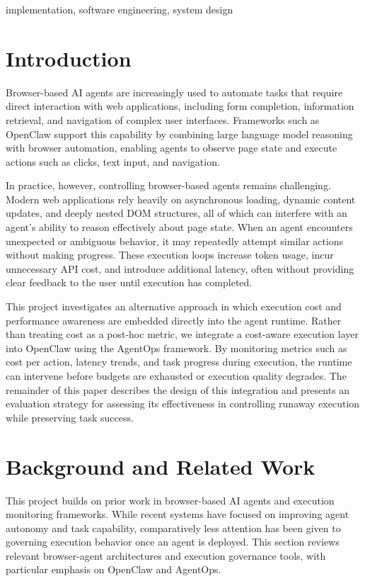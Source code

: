 \documentclass[conference]{IEEEtran}
\begin{document}
\begin{IEEEkeywords}
implementation, software engineering, system design
\end{IEEEkeywords}

\section{Introduction}

Browser-based AI agents are increasingly used to automate tasks that require direct interaction with web applications, including form completion, information retrieval, and navigation of complex user interfaces. Frameworks such as OpenClaw support this capability by combining large language model reasoning with browser automation, enabling agents to observe page state and execute actions such as clicks, text input, and navigation.

In practice, however, controlling browser-based agents remains challenging. Modern web applications rely heavily on asynchronous loading, dynamic content updates, and deeply nested DOM structures, all of which can interfere with an agent’s ability to reason effectively about page state. When an agent encounters unexpected or ambiguous behavior, it may repeatedly attempt similar actions without making progress. These execution loops increase token usage, incur unnecessary API cost, and introduce additional latency, often without providing clear feedback to the user until execution has completed.

This project investigates an alternative approach in which execution cost and performance awareness are embedded directly into the agent runtime. Rather than treating cost as a post-hoc metric, we integrate a cost-aware execution layer into OpenClaw using the AgentOps framework. By monitoring metrics such as cost per action, latency trends, and task progress during execution, the runtime can intervene before budgets are exhausted or execution quality degrades. The remainder of this paper describes the design of this integration and presents an evaluation strategy for assessing its effectiveness in controlling runaway execution while preserving task success.


\section{Background and Related Work}

This project builds on prior work in browser-based AI agents and execution monitoring frameworks. While recent systems have focused on improving agent autonomy and task capability, comparatively less attention has been given to governing execution behavior once an agent is deployed. This section reviews relevant browser-agent architectures and execution governance tools, with particular emphasis on OpenClaw and AgentOps.
\end{document}
